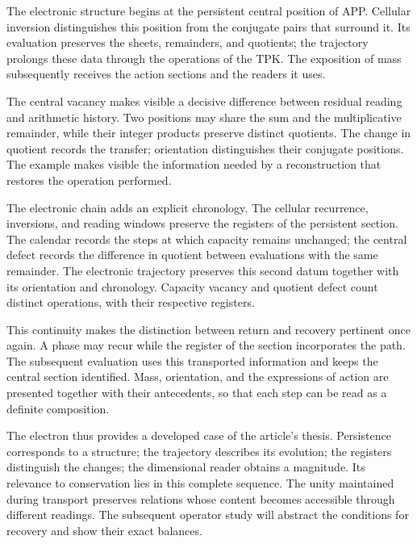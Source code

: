 
The electronic structure begins at the persistent central position of APP.
Cellular inversion distinguishes this position from the conjugate pairs
that surround it. Its evaluation preserves the sheets, remainders, and
quotients; the trajectory prolongs these data through the operations of the
TPK. The exposition of mass subsequently receives the action sections and
the readers it uses.

The central vacancy makes visible a decisive difference between residual
reading and arithmetic history. Two positions may share the sum and the
multiplicative remainder, while their integer products preserve distinct
quotients. The change in quotient records the transfer; orientation
distinguishes their conjugate positions. The example makes visible the
information needed by a reconstruction that restores the operation
performed.

The electronic chain adds an explicit chronology. The cellular recurrence,
inversions, and reading windows preserve the registers of the persistent
section. The calendar records the steps at which capacity remains
unchanged; the central defect records the difference in quotient between
evaluations with the same remainder. The electronic trajectory preserves
this second datum together with its orientation and chronology. Capacity
vacancy and quotient defect count distinct operations, with their
respective registers.

This continuity makes the distinction between return and recovery
pertinent once again. A phase may recur while the register of the section
incorporates the path. The subsequent evaluation uses this transported
information and keeps the central section identified. Mass, orientation,
and the expressions of action are presented together with their
antecedents, so that each step can be read as a definite composition.

The electron thus provides a developed case of the article's thesis.
Persistence corresponds to a structure; the trajectory describes its
evolution; the registers distinguish the changes; the dimensional reader
obtains a magnitude. Its relevance to conservation lies in this complete
sequence. The unity maintained during transport preserves relations whose
content becomes accessible through different readings. The subsequent
operator study will abstract the conditions for recovery and show their
exact balances.
